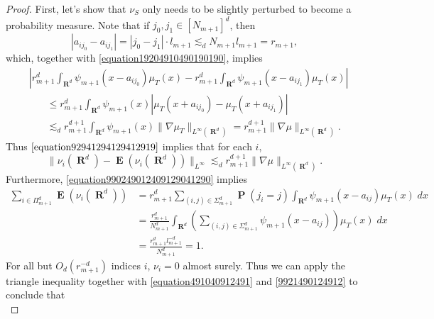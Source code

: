 \documentclass[12pt,reqno]{amsart}
\DeclareMathOperator{\RR}{\mathbf{R}}
\DeclareMathOperator{\EE}{\mathbf{E}}
\DeclareMathOperator{\PP}{\mathbf{P}}
\begin{document}
\begin{proof}
    First, let's show that $\nu_S$ only needs to be slightly perturbed to become a probability measure. Note that if $j_0,j_1 \in [N_{m+1}]^d$, then
	\[ |a_{ij_0} - a_{ij_1}| = |j_0 - j_1| \cdot l_{m+1} \lesssim_d N_{m+1} l_{m+1} = r_{m+1}, \]
	which, together with \eqref{equation19204910490190190}, implies
	\begin{equation} \label{equation92941294129412919}
	\begin{split}
		&\left| r_{m+1}^d \int_{\RR^d} \psi_{m+1}(x - a_{ij_0}) \mu_T(x) - r_{m+1}^d \int_{\RR^d} \psi_{m+1}(x - a_{ij_1}) \mu_T(x) \right|\\
		&\ \ \ \ \ \ \ \ \leq r_{m+1}^d \int_{\RR^d} \psi_{m+1}(x) \left| \mu_T(x + a_{ij_0}) - \mu_T(x + a_{ij_1}) \right|\\
		&\ \ \ \ \ \ \ \ \lesssim_d r_{m+1}^{d+1} \int_{\RR^d} \psi_{m+1}(x) \| \nabla \mu_T \|_{L^\infty(\RR^d)} = r_{m+1}^{d+1} \| \nabla \mu \|_{L^\infty(\RR^d)}.
	\end{split}
	\end{equation}
	Thus $\eqref{equation92941294129412919}$ implies that for each $i$,
	\begin{equation} \label{equation491040912491}
		\| \nu_i(\RR^d) - \EE(\nu_i(\RR^d)) \|_{L^\infty} \lesssim_d r_{m+1}^{d+1} \| \nabla \mu \|_{L^\infty(\RR^d)}.
	\end{equation}
	Furthermore, \eqref{equation990249012409129041290} implies
	\begin{equation} \label{9921490124912}
	\begin{split}
		\sum_{i \in \Pi_{m+1}^d} \EE(\nu_i(\RR^d)) &= r_{m+1}^d \sum\nolimits_{(i,j) \in \Sigma_{m+1}^d} \PP(j_i = j) \int_{\RR^d} \psi_{m+1}(x - a_{ij}) \mu_T(x)\; dx\\
		&= \frac{r_{m+1}^d}{N_{m+1}^d} \int_{\RR^d} \left( \sum\nolimits_{(i,j) \in \Sigma_{m+1}^d} \psi_{m+1}(x - a_{ij}) \right) \mu_T(x)\; dx\\
		&= \frac{r_{m+1}^d l_{m+1}^{-d}}{N_{m+1}^d} = 1.
	\end{split}
	\end{equation}
	For all but $O_d(r_{m+1}^{-d})$ indices $i$, $\nu_i = 0$ almost surely. Thus we can apply the triangle inequality together with \eqref{equation491040912491} and \eqref{9921490124912} to conclude that
	\begin{equation} \label{equation42214124124102412}

\end{equation}
\end{proof}
\end{document}

